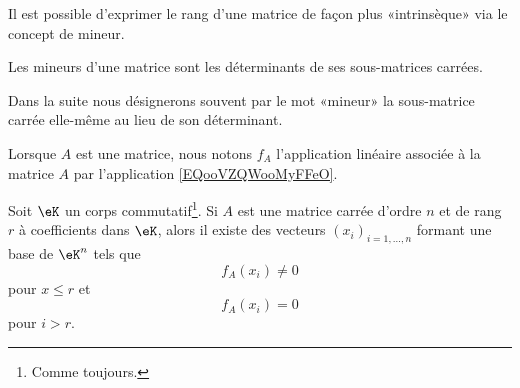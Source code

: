 Il est possible d'exprimer le rang d'une matrice de façon plus «intrinsèque» via le concept de mineur.
\begin{definition}
	Les mineurs d'une matrice sont les déterminants de ses sous-matrices carrées.
\end{definition}
Dans la suite nous désignerons souvent par le mot «mineur» la sous-matrice carrée elle-même au lieu de son déterminant.

Lorsque \( A\) est une matrice, nous notons \( f_A\) l'application linéaire associée à la matrice \( A\) par l'application \eqref{EQooVZQWooMyFFeO}.

\begin{lemma} \label{LEMVecsaRgFixe}
	Soit \( \eK \) un corps commutatif\footnote{Comme toujours.}. Si \( A \) est une matrice carrée d'ordre \( n \) et de rang \( r \) à coefficients dans \( \eK \), alors il existe des vecteurs \( (x_i)_{i=1,\dots,n} \) formant une base de \( \eK^n \) tels que
	\begin{equation}
		f_A(x_i)\neq 0
	\end{equation}
	pour \( x\leq r\) et
	\begin{equation}
		f_A(x_i) = 0
	\end{equation}
	pour \( i > r \).
\end{lemma}

